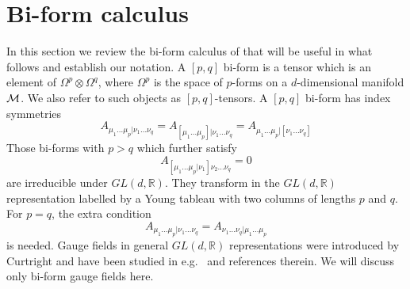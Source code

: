 \section{Bi-form calculus}
\label{sec:biforms}

In this section we review the bi-form calculus of \cite{Medeiros2003ExoticDuality} that will be useful in what follows and establish our notation. 
A $[p,q]$ bi-form is a tensor which is an element of $\Omega^p \otimes \Omega^q$, where $\Omega^p$ is the space of $p$-forms on a $d$-dimensional manifold $\mathcal{M}$. We also refer to such objects as $[p,q]$-tensors. A $[p,q]$ bi-form has index symmetries
\begin{equation}
    A_{\mu_1\dots\mu_p|\nu_1\dots\nu_q} = A_{[\mu_1\dots\mu_p]|\nu_1\dots\nu_q} = A_{\mu_1\dots\mu_p|[\nu_1\dots\nu_q]}
\end{equation}
Those bi-forms with $p>q$ which further satisfy
\begin{equation}
    A_{[\mu_1\dots\mu_p|\nu_1]\nu_2\dots\nu_q} = 0
\end{equation}
are irreducible under $GL(d,\mathbb{R})$. They transform in the $GL(d,\mathbb{R})$ representation labelled by a Young tableau with two columns of lengths $p$ and $q$.
For $p=q$, the extra  condition
\begin{equation}
   A_{\mu_1\dots\mu_p|\nu_1\dots\nu_q}= A_{\nu_1\dots\nu_q|\mu_1\dots\mu_p}
\end{equation}is needed.
Gauge fields in general $GL(d,\mathbb{R})$ representations  were introduced by Curtright \cite{Curtright:1980yk} and have
been studied in e.g.\ \cite{Medeiros2003ExoticDuality, Bekaert2004, Dubois-Violette:1999iqe,Dubois-Violette:2000fok, Dubois-Violette:2001wjr,Howe2018SCKYT,  deMedeiros:2003osq, Hull2001DualityFields, Henneaux:2004jw, Hinterbichler2023GravitySymmetries, Hinterbichler:2024cxn} and references therein. We will discuss only bi-form gauge fields here.

